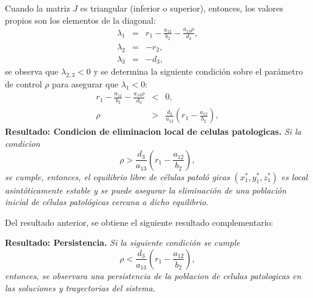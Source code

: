 \documentclass[letterpaper,11pt]{article}
\begin{document}
Cuando la matriz $J$ es triangular (inferior o superior), entonces, los
valores propios son los elementos de la diagonal:%
\begin{eqnarray*}
\lambda _{1} &=&r_{1}-\frac{a_{12}}{b_{2}}-\frac{a_{13}\rho }{d_{3}}, \\
\lambda _{2} &=&-r_{2}, \\
\lambda _{3} &=&-d_{3},
\end{eqnarray*}%
se observa que $\lambda _{2,3}<0$ y se determina la siguiente condici\'{o}n
sobre el par\'{a}metro de control $\rho $ para asegurar que $\lambda _{1}<0:$%
\begin{eqnarray*}
r_{1}-\frac{a_{12}}{b_{2}}-\frac{a_{13}\rho }{d_{3}} &<&0, \\
\rho &>&\frac{d_{3}}{a_{13}}\left( r_{1}-\frac{a_{12}}{b_{2}}\right) ,
\end{eqnarray*}%
\textbf{Resultado: Condicion de eliminacion local de celulas patologicas. }%
\emph{Si la condicion}%
\begin{equation*}
\rho >\frac{d_{3}}{a_{13}}\left( r_{1}-\frac{a_{12}}{b_{2}}\right) ,
\end{equation*}%
\emph{se cumple, entonces, el equilibrio libre de c\'{e}lulas patol\'{o}%
gicas }$\left( x_{1}^{\ast },y_{1}^{\ast },z_{1}^{\ast }\right) $ \emph{es
local asint\'{o}ticamente estable y se puede asegurar la eliminaci\'{o}n de
una poblaci\'{o}n inicial de c\'{e}lulas patol\'{o}gicas cercana a dicho
equilibrio.}

\bigskip

Del resultado anterior, se obtiene el siguiente resultado complementario:

\bigskip

\textbf{Resultado: Persistencia. }\emph{Si la siguiente condici\'{o}n se
cumple}%
\begin{equation*}
\rho <\frac{d_{3}}{a_{13}}\left( r_{1}-\frac{a_{12}}{b_{2}}\right) ,
\end{equation*}%
\emph{entonces, se observara una persistencia de la poblacion de celulas
patologicas en las soluciones y trayectorias del sistema.}

\bigskip
\end{document}
